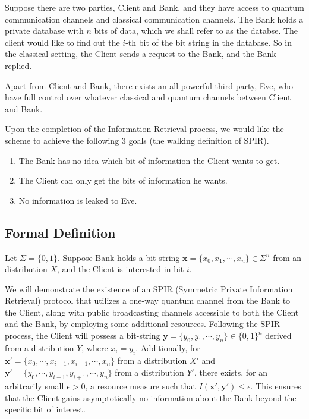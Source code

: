 \documentclass[%
 reprint,
superscriptaddress,
 amsmath,amssymb,
 aps,
]{revtex4-2}
\begin{document}
Suppose there are two parties, Client and Bank, and they have access to quantum communication channels and classical communication channels. The Bank holds a private database with $n$ bits of data, which we shall refer to as the databse. The client would like to find out the $i$-th bit of the bit string in the database. So in the classical setting, the Client sends a request to the Bank, and the Bank replied.

Apart from Client and Bank, there exists an all-powerful third party, Eve, who have full control over whatever classical and quantum channels between Client and Bank.

Upon the completion of the Information Retrieval process, we would like the scheme to achieve the following 3 goals (the walking definition of SPIR).

\begin{enumerate}

    \item The Bank has no idea which bit of information the Client wants to get.

    \item The Client can only get the bits of information he wants.

    \item No information is leaked to Eve.
\end{enumerate}

\subsection{Formal Definition}
\label{sec:formal_definition}

Let $\Sigma=\{0, 1\}$. Suppose Bank holds a bit-string $\textbf{x}=\{x_0, x_1, \cdots, x_n\}\in\Sigma^n$ from an distribution $X$, and the Client is interested in bit $i$. 

We will demonstrate the existence of an SPIR (Symmetric Private Information Retrieval) protocol that utilizes a one-way quantum channel from the Bank to the Client, along with public broadcasting channels accessible to both the Client and the Bank, by employing some additional resources. Following the SPIR process, the Client will possess a bit-string \( \mathbf{y} = \{y_0, y_1, \cdots, y_n\} \in \{0, 1\}^n \) derived from a distribution \( Y \), where \( x_i = y_i \). Additionally, for \( \mathbf{x'} = \{x_0, \cdots, x_{i-1}, x_{i+1}, \cdots, x_n\} \) from a distribution \( X' \) and \( \mathbf{y'} = \{y_0, \cdots, y_{i-1}, y_{i+1}, \cdots, y_n\} \) from a distribution \( Y' \), there exists, for an arbitrarily small \( \epsilon > 0 \), a resource measure such that \( I(\mathbf{x'}, \mathbf{y'}) \le \epsilon \). This ensures that the Client gains asymptotically no information about the Bank beyond the specific bit of interest.
\end{document}
